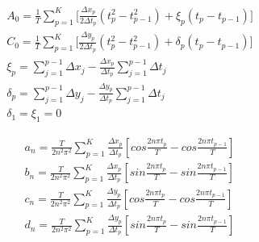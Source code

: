 \documentclass[thesis.tex]{subfiles}
\begin{document}
\begin{equation} \label{eq:dft_dc}
\begin{split}
 A_0 =  \frac{1}{T} \sum_{p=1}^{K} \bigg[ \frac{\Delta x_p}{2 \Delta t_p} (t_p^2 - t_{p-1}^2) + \xi_p(t_p - t_{p-1})\bigg] \\
 C_0 =  \frac{1}{T} \sum_{p=1}^{K} \bigg[ \frac{\Delta y_p}{2 \Delta t_p} (t_p^2 - t_{p-1}^2) + \delta_p(t_p - t_{p-1})\bigg] \\
 \xi_p =  \sum_{j=1}^{p-1} \Delta x_j - \frac{\Delta x_p}{\Delta t_p} \sum_{j=1}^{p-1}\Delta t_j \\
 \delta_p =  \sum_{j=1}^{p-1} \Delta y_j - \frac{\Delta y_p}{\Delta t_p} \sum_{j=1}^{p-1}\Delta t_j \\
 \delta_1 =  \xi_1 = 0
\end{split}
\end{equation}    


\begin{equation} \label{eq:dft_coefficients}
\begin{split}
 a_n = \frac{T}{2n^2\pi^2} \sum_{p=1}^{K}\frac{\Delta x_p}{\Delta t_p}[cos\frac{2n\pi t_p}{T} - cos\frac{2n\pi t_{p-1}}{T}] \\
 b_n = \frac{T}{2n^2\pi^2} \sum_{p=1}^{K}\frac{\Delta x_p}{\Delta t_p}[sin\frac{2n\pi t_p}{T} - sin\frac{2n\pi t_{p-1}}{T}] \\
 c_n = \frac{T}{2n^2\pi^2} \sum_{p=1}^{K}\frac{\Delta y_p}{\Delta t_p}[cos\frac{2n\pi t_p}{T} - cos\frac{2n\pi t_{p-1}}{T}] \\
 d_n = \frac{T}{2n^2\pi^2} \sum_{p=1}^{K}\frac{\Delta y_p}{\Delta t_p}[sin\frac{2n\pi t_p}{T} - sin\frac{2n\pi t_{p-1}}{T}]
\end{split}
\end{equation} 
\end{document}
